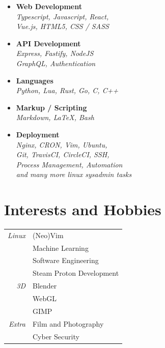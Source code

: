 \documentclass[11pt,oneside,a4paper,titlepage]{article}
\begin{document}
\begin{tcolorbox}
\begin{minipage}[t]{9cm}
\begin{tcolorbox}[grow to left by=0.55cm,colback=themeBorder,colframe=white,arc=0mm,]
      \begin{itemize}[leftmargin=0.8cm]
        \item{
          \textbf{Web Development} \\ 
          \emph{Typescript, Javascript, React,} \\
          \emph{Vue.js, HTML5, CSS / SASS}
        }
        \item{
            \textbf{API Development} \\
            \emph{Express, Fastify, NodeJS} \\
            \emph{GraphQL, Authentication}
          }
        \item{
            \textbf{Languages} \\
            \emph{Python, Lua, Rust, Go, C, C++}
          }
        \item{
            \textbf{Markup / Scripting} \\
            \emph{Markdown, LaTeX, Bash}
          }
        \item{
            \textbf{Deployment} \\
            \emph{Nginx, CRON, Vim, Ubuntu,} \\
            \emph{Git, TravisCI, CircleCI, SSH,} \\
            \emph{Process Management, Automation} \\
            \emph{and many more linux sysadmin tasks}
          }
      \end{itemize}

      \section*{Interests and Hobbies}
      \begin{tabular}{r l}
        \emph{Linux}  & (Neo)Vim \\
                      & Machine Learning \\
                      & Software Engineering \\
                      & Steam Proton Development \\
        \emph{3D}     & Blender \\
                      & WebGL \\
                      & GIMP \\
        \emph{Extra}  & Film and Photography \\
                      & Cyber Security
      \end{tabular}
    \end{tcolorbox}
  \end{minipage}
  \begin{minipage}[t]{10cm}
    \vspace*{-0.5cm}
    \begin{tcolorbox}[grow to right by=1cm,colframe=white,colback=white]

\end{tcolorbox}
\end{minipage}
\end{tcolorbox}
\end{document}
